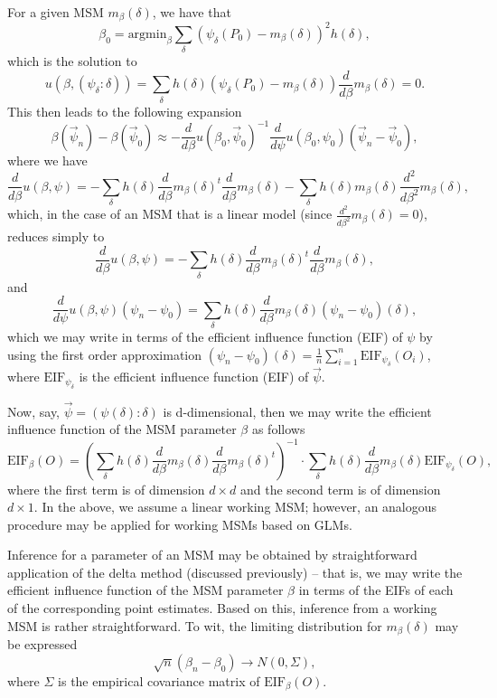 \documentclass[
  12pt, krantz2,
]{krantz}
\theoremstyle{definition}
\theoremstyle{definition}
\theoremstyle{definition}
\newcommand{\1}{\mathbbm{1}}
\begin{document}
For a given MSM \(m_{\beta}(\delta)\), we have that
\[\beta_0 = \text{argmin}_{\beta} \sum_{\delta}(\psi_{\delta}(P_0) -
m_{\beta}(\delta))^2 h(\delta),\]
which is the solution to
\[u(\beta, (\psi_{\delta}: \delta)) = \sum_{\delta}h(\delta)
\left(\psi_{\delta}(P_0) - m_{\beta}(\delta) \right) \frac{d}{d\beta}
m_{\beta}(\delta) = 0.\]
This then leads to the following expansion
\[\beta(\vec{\psi}_n) - \beta(\vec{\psi}_0) \approx -\frac{d}{d\beta}
  u(\beta_0, \vec{\psi}_0)^{-1} \frac{d}{d\psi} u(\beta_0, \psi_0)
  (\vec{\psi}_n - \vec{\psi}_0),\]
where we have
\[\frac{d}{d\beta} u(\beta, \psi) = -\sum_{\delta} h(\delta) \frac{d}{d\beta}
m_{\beta}(\delta)^t \frac{d}{d\beta} m_{\beta}(\delta)
-\sum_{\delta} h(\delta) m_{\beta}(\delta) \frac{d^2}{d\beta^2}
m_{\beta}(\delta),\]
which, in the case of an MSM that is a linear model (since
\(\frac{d^2}{d\beta^2} m_{\beta}(\delta) = 0\)), reduces simply to
\[\frac{d}{d\beta} u(\beta, \psi) = -\sum_{\delta} h(\delta) \frac{d}{d\beta}
m_{\beta}(\delta)^t \frac{d}{d\beta} m_{\beta}(\delta),\]
and
\[\frac{d}{d\psi}u(\beta, \psi)(\psi_n - \psi_0) = \sum_{\delta} h(\delta)
\frac{d}{d\beta} m_{\beta}(\delta) (\psi_n - \psi_0)(\delta),\]
which we may write in terms of the efficient influence function (EIF) of \(\psi\)
by using the first order approximation \((\psi_n - \psi_0)(\delta) = \frac{1}{n}\sum_{i = 1}^n \text{EIF}_{\psi_{\delta}}(O_i)\),
where \(\text{EIF}_{\psi_{\delta}}\) is the efficient influence function (EIF) of
\(\vec{\psi}\).

Now, say, \(\vec{\psi} = (\psi(\delta): \delta)\) is d-dimensional, then we may
write the efficient influence function of the MSM parameter \(\beta\) as follows
\[\text{EIF}_{\beta}(O) = \left(\sum_{\delta} h(\delta) \frac{d}{d\beta}
m_{\beta}(\delta) \frac{d}{d\beta} m_{\beta}(\delta)^t \right)^{-1} \cdot
\sum_{\delta} h(\delta) \frac{d}{d\beta} m_{\beta}(\delta)
\text{EIF}_{\psi_{\delta}}(O),\] where the first term is of dimension
\(d \times d\) and the second term is of dimension \(d \times 1\). In the above, we
assume a linear working MSM; however, an analogous procedure may be applied for
working MSMs based on GLMs.

Inference for a parameter of an MSM may be obtained by straightforward
application of the delta method (discussed previously) -- that is, we may
write the efficient influence function of the MSM parameter \(\beta\) in terms of
the EIFs of each of the corresponding point estimates. Based on this, inference
from a working MSM is rather straightforward. To wit, the limiting distribution
for \(m_{\beta}(\delta)\) may be expressed \[\sqrt{n}(\beta_n - \beta_0) \to N(0,
\Sigma),\] where \(\Sigma\) is the empirical covariance matrix of
\(\text{EIF}_{\beta}(O)\).
\end{document}
